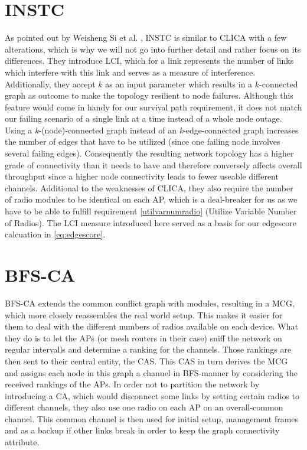   \section{\ac{INSTC}}
    As pointed out by Weisheng Si et al. \cite{overview_caa}, \ac{INSTC} \cite{INSTC} is similar to \ac{CLICA} with a few alterations, 
    which is why we will not go into further detail and rather focus on its differences. 
    They introduce \ac{LCI}, which for a link represents the number of links which interfere with this link \cite{overview_caa} and serves as a measure of 
    interference. Additionally, they accept \(k\) as an input parameter which results in a \(k\)-connected graph as outcome to make the topology resilient to node failures.
    Although this feature would come in handy for our survival path requirement, it does not match our failing scenario of a single link at a time instead of a whole node outage.
    Using a \textit{k}-(node)-connected graph instead of an \textit{k}-edge-connected graph increases the number of edges that have to be utilized 
    (since one failing node involves several failing edges). Consequently the resulting network topology has a higher grade of connectivity than it needs to 
    have and therefore conversely affects overall throughput since a higher node connectivity leads to fewer useable different channels. 
    Additional to the weaknesses of \ac{CLICA}, they also require the number of radio modules to be identical on each \ac{AP}, 
    which is a deal-breaker for us as we have to be able to fulfill requirement \ref{utilvarnumradio} (Utilize Variable Number of Radios).
    The \ac{LCI} measure introduced here served as a basis for our edgescore calcuation in \ref{eq:edgescore}.
    
  \section{\ac{BFS-CA}}
    \ac{BFS-CA} \cite{BFS-CA} extends the common conflict graph with modules, resulting in a \ac{MCG}, which more closely reassembles the
    real world setup. This makes it easier for them to deal with the different numbers of radios available on each device. 
    What they do is to let the APs (or mesh routers in their case) sniff the network on regular intervalls and determine a ranking for the channels.
    Those rankings are then sent to their central entity, the \ac{CAS}. This \ac{CAS} in turn derives the \ac{MCG} and assigns each node in this graph 
    a channel in \ac{BFS}-manner by considering the received rankings of the APs. In order not to partition the network by introducing a \ac{CA}, which 
    would disconnect some links by setting certain radios to different channels, they also use one radio on each AP on an overall-common channel.
    This common channel is then used for initial setup, management frames and as a backup if other links break in order to keep the graph connectivity attribute.
    
